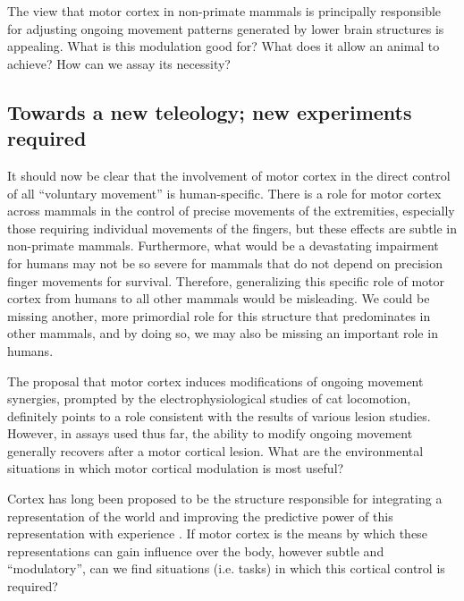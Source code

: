 The view that motor cortex in non-primate mammals is principally responsible for adjusting ongoing movement patterns generated by lower brain structures is appealing. What is this modulation good for? What does it allow an animal to achieve? How can we assay its necessity?

\subsection{Towards a new teleology; new experiments required}

It should now be clear that the involvement of motor cortex in the direct control of all ``voluntary movement'' is human-specific. There is a role for motor cortex across mammals in the control of precise movements of the extremities, especially those requiring individual movements of the fingers, but these effects are subtle in non-primate mammals. Furthermore, what would be a devastating impairment for humans may not be so severe for mammals that do not depend on precision finger movements for survival. Therefore, generalizing this specific role of motor cortex from humans to all other mammals would be misleading. We could be missing another, more primordial role for this structure that predominates in other mammals, and by doing so, we may also be missing an important role in humans.

The proposal that motor cortex induces modifications of ongoing movement synergies, prompted by the electrophysiological studies of cat locomotion, definitely points to a role consistent with the results of various lesion studies. However, in assays used thus far, the ability to modify ongoing movement generally recovers after a motor cortical lesion. What are the environmental situations in which motor cortical modulation is most useful?

Cortex has long been proposed to be the structure responsible for integrating a representation of the world and improving the predictive power of this representation with experience \citep{Barlow1985,Doya1999}. If motor cortex is the means by which these representations can gain influence over the body, however subtle and ``modulatory'', can we find situations (i.e. tasks) in which this cortical control is required?

